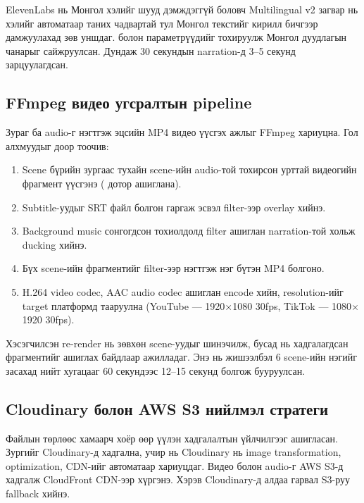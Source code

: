 ElevenLabs нь Монгол хэлийг шууд дэмждэггүй боловч Multilingual v2 загвар нь хэлийг автоматаар таних чадвартай тул Монгол текстийг кирилл бичгээр дамжуулахад зөв уншдаг.  болон  параметрүүдийг тохируулж Монгол дуудлагын чанарыг сайжруулсан. Дундаж 30 секундын narration-д 3--5 секунд зарцуулагдсан.

\subsection{FFmpeg видео угсралтын pipeline}

Зураг ба audio-г нэгтгэж эцсийн MP4 видео үүсгэх ажлыг FFmpeg хариуцна. Гол алхмуудыг доор тоочив:

\begin{enumerate}
\item Scene бүрийн зургаас тухайн scene-ийн audio-той тохирсон урттай видеогийн фрагмент үүсгэнэ ( дотор  ашиглана).
\item Subtitle-уудыг SRT файл болгон гаргаж  эсвэл  filter-ээр overlay хийнэ.
\item Background music сонгогдсон тохиолдолд  filter ашиглан narration-той хольж ducking хийнэ.
\item Бүх scene-ийн фрагментийг  filter-ээр нэгтгэж нэг бүтэн MP4 болгоно.
\item H.264 video codec, AAC audio codec ашиглан encode хийн, resolution-ийг target платформд тааруулна (YouTube --- 1920$\times$1080 30fps, TikTok --- 1080$\times$1920 30fps).
\end{enumerate}

Хэсэгчилсэн re-render нь зөвхөн  scene-уудыг шинэчилж, бусад нь хадгалагдсан фрагментийг ашиглах байдлаар ажилладаг. Энэ нь жишээлбэл 6 scene-ийн нэгийг засахад нийт хугацааг 60 секундээс 12--15 секунд болгож бууруулсан.

\subsection{Cloudinary болон AWS S3 нийлмэл стратеги}

Файлын төрлөөс хамаарч хоёр өөр үүлэн хадгалалтын үйлчилгээг ашигласан. Зургийг Cloudinary-д хадгална, учир нь Cloudinary нь image transformation, optimization, CDN-ийг автоматаар хариуцдаг. Видео болон audio-г AWS S3-д хадгалж CloudFront CDN-ээр хүргэнэ. Хэрэв Cloudinary-д алдаа гарвал S3-руу fallback хийнэ.

